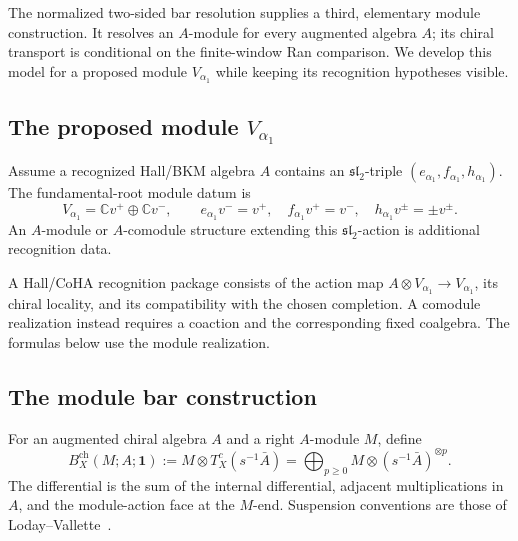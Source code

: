 The normalized two-sided bar resolution supplies a third, elementary
module construction.  It resolves an \(A\)-module for every augmented
algebra \(A\); its chiral transport is conditional on the
finite-window Ran comparison.  We develop this model for a proposed
module \(V_{\alpha_1}\) while keeping its recognition hypotheses
visible.

\subsection{The proposed module \(V_{\alpha_1}\)}
\label{subsec:tbsp-module-valpha1}

\begin{definition}
\label{def:tbsp-valpha1}
Assume a recognized Hall/BKM algebra \(A\) contains an
\(\mathfrak{sl}_2\)-triple
\((e_{\alpha_1},f_{\alpha_1},h_{\alpha_1})\).  The fundamental-root
module datum is
\begin{equation}\label{eq:tbsp-valpha1-definition}
 V_{\alpha_1}=\mathbb C v^+\oplus\mathbb C v^-,
 \qquad
 e_{\alpha_1}v^-=v^+,\quad
 f_{\alpha_1}v^+=v^-,\quad
 h_{\alpha_1}v^\pm=\pm v^\pm .
\end{equation}
An \(A\)-module or \(A\)-comodule structure extending this
\(\mathfrak{sl}_2\)-action is additional recognition data.
\end{definition}

\begin{remark}
\label{rem:tbsp-valpha1-legitimate}
A Hall/CoHA recognition package consists of the action map
\(A\otimes V_{\alpha_1}\to V_{\alpha_1}\), its chiral locality, and
its compatibility with the chosen completion.  A comodule
realization instead requires a coaction and the corresponding fixed
coalgebra.  The formulas below use the module realization.
\end{remark}

\subsection{The module bar construction}
\label{subsec:tbsp-barvalpha1}

\begin{definition}
\label{def:tbsp-barch-module}
For an augmented chiral algebra \(A\) and a right \(A\)-module \(M\),
define
\begin{equation}\label{eq:tbsp-barch-module}
 B_X^{\mathrm{ch}}(M;A;\mathbf1)
 :=
 M\otimes T_X^c(s^{-1}\bar A)
 =
 \bigoplus_{p\geq0}M\otimes(s^{-1}\bar A)^{\otimes p}.
\end{equation}
The differential is the sum of the internal differential, adjacent
multiplications in \(A\), and the module-action face at the \(M\)-end.
Suspension conventions are those of
Loday--Vallette~\cite[\S2.2]{LV12}.
\end{definition}

